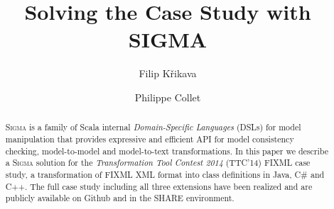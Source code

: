 \documentclass[submission]{eptcs}
\title{Solving the \TTC \FIXML Case Study with SIGMA}
\author{
  Filip Křikava
  \institute{University Lille 1 - LIFL}
  \institute{INRIA Lille, Nord Europe}
  \institute{France}
  \email{\href{mailto:filip.krikava@inria.fr}{filip.krikava@inria.fr}}
\and
  Philippe Collet
  \institute{Université Nice - Sophia Antipolis}
  \institute{CNRS, I3S, UMR 7271}
  \institute{06900 Sophia Antipolis, France}
  \email{\quad \href{mailto:philippe.collet@unice.fr}{philippe.collet@unice.fr}}
}
\newcommand{\SIGMA}{\textsc{Sigma}\xspace}
\newcommand{\TTC}{TTC'14\xspace}
\newcommand{\Csharp}{C\#\xspace}
\begin{document}
\maketitle

\begin{abstract}
\SIGMA is a family of Scala internal \emph{Domain-Specific Languages} (DSLs) for model manipulation that provides expressive and efficient API for model consistency checking, model-to-model and model-to-text transformations.
In this paper we describe a \SIGMA solution for the \emph{Transformation Tool Contest 2014} (\TTC) FIXML case study, a transformation of FIXML XML format into class definitions in Java, \Csharp and C++.
The full case study including all three extensions have been realized and are publicly available on Github and in the SHARE environment.	
\end{abstract}









	



\end{document}
